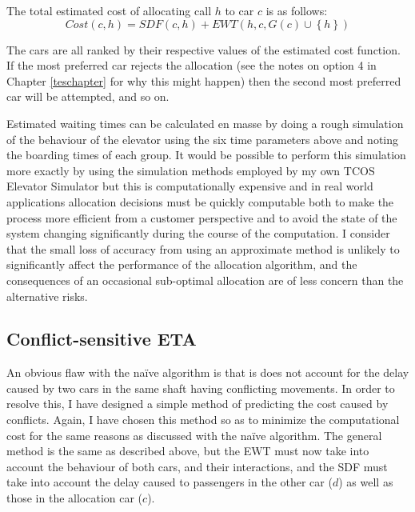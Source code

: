 \documentclass{UoYCSproject}
\begin{document}
The total estimated cost of allocating call $h$ to car $c$ is as follows:
\[ Cost(c, h) = SDF(c, h) + EWT(h, c, G(c) \cup \left\{ h \right\}) \]

The cars are all ranked by their respective values of the estimated cost function.  If the most preferred car rejects the allocation (see the notes on option 4 in Chapter \ref{teschapter} for why this might happen) then the second most preferred car will be attempted, and so on.

Estimated waiting times can be calculated en masse by doing a rough simulation of the behaviour of the elevator using the six time parameters above and noting the boarding times of each group.  It would be possible to perform this simulation more exactly by using the simulation methods employed by my own TCOS Elevator Simulator but this is computationally expensive and in real world applications allocation decisions must be quickly computable both to make the process more efficient from a customer perspective and to avoid the state of the system changing significantly during the course of the computation.  I consider that the small loss of accuracy from using an approximate method is unlikely to significantly affect the performance of the allocation algorithm, and the consequences of an occasional sub-optimal allocation are of less concern than the alternative risks.

\subsection{Conflict-sensitive ETA}
\label{algETAconflict}

An obvious flaw with the na\"{i}ve algorithm is that is does not account for the delay caused by two cars in the same shaft having conflicting movements.  In order to resolve this, I have designed a simple method of predicting the cost caused by conflicts.  Again, I have chosen this method so as to minimize the computational cost for the same reasons as discussed with the na\"{i}ve algorithm.  The general method is the same as described above, but the EWT must now take into account the behaviour of both cars, and their interactions, and the SDF must take into account the delay caused to passengers in the other car ($d$) as well as those in the allocation car ($c$).
\end{document}

